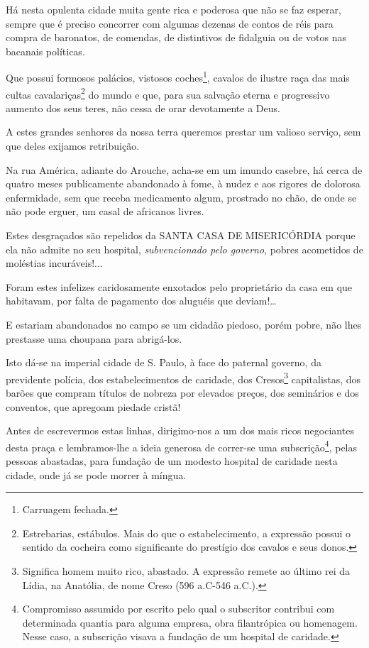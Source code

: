 \asterisc{}

Há nesta opulenta cidade muita gente rica e poderosa que não se faz
esperar, sempre que é preciso concorrer com algumas dezenas de contos de
réis para compra de baronatos, de comendas, de distintivos de fidalguia
ou de votos nas bacanais políticas.

Que possui formosos palácios, vistosos coches\footnote{Carruagem
  fechada.}, cavalos de ilustre raça das mais cultas
cavalariças\footnote{Estrebarias, estábulos. Mais do que o
  estabelecimento, a expressão possui o sentido da cocheira como
  significante do prestígio dos cavalos e seus donos.} do mundo e que,
para sua salvação eterna e progressivo aumento dos seus teres, não cessa
de orar devotamente a Deus.

A estes grandes senhores da nossa terra queremos prestar um valioso
serviço, sem que deles exijamos retribuição.

Na rua América, adiante do Arouche, acha-se em um imundo casebre, há
cerca de quatro meses publicamente abandonado à fome, à nudez e aos
rigores de dolorosa enfermidade, sem que receba medicamento algum,
prostrado no chão, de onde se não pode erguer, um casal de africanos
livres.

Estes desgraçados são repelidos da SANTA CASA DE MISERICÓRDIA porque ela
não admite no seu hospital, \emph{subvencionado pelo governo}, pobres
acometidos de moléstias incuráveis!...

Foram estes infelizes caridosamente enxotados pelo proprietário da casa
em que habitavam, por falta de pagamento dos aluguéis que
deviam!\ldots{}

E estariam abandonados no campo se um cidadão piedoso, porém pobre, não
lhes prestasse uma choupana para abrigá-los.

Isto dá-se na imperial cidade de S. Paulo, à face do paternal governo,
da previdente polícia, dos estabelecimentos de caridade, dos
Cresos\footnote{Significa homem muito rico, abastado. A expressão
  remete ao último rei da Lídia, na Anatólia, de nome Creso (596 a.C-546
  a.C.).} capitalistas, dos barões que compram títulos de nobreza por
elevados preços, dos seminários e dos conventos, que apregoam piedade
cristã!

Antes de escrevermos estas linhas, dirigimo-nos a um dos mais ricos
negociantes desta praça e lembramos-lhe a ideia generosa de correr-se
uma subscrição\footnote{Compromisso assumido por escrito pelo qual o
  subscritor contribui com determinada quantia para alguma empresa, obra
  filantrópica ou homenagem. Nesse caso, a subscrição visava a fundação
  de um hospital de caridade.}, pelas pessoas abastadas, para fundação
de um modesto hospital de caridade nesta cidade, onde já se pode morrer
à míngua.

